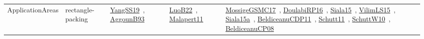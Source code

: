 {\begin{longtable}{lp{3cm}>{\raggedright\arraybackslash}p{6cm}>{\raggedright\arraybackslash}p{6cm}>{\raggedright\arraybackslash}p{8cm}}
ApplicationAreas & rectangle-packing & \href{../works/YangSS19.pdf}{YangSS19}~\cite{YangSS19}, \href{../works/AggounB93.pdf}{AggounB93}~\cite{AggounB93} & \href{../works/LuoB22.pdf}{LuoB22}~\cite{LuoB22}, \href{../works/Malapert11.pdf}{Malapert11}~\cite{Malapert11} & \href{../works/MossigeGSMC17.pdf}{MossigeGSMC17}~\cite{MossigeGSMC17}, \href{../works/DoulabiRP16.pdf}{DoulabiRP16}~\cite{DoulabiRP16}, \href{../works/Siala15.pdf}{Siala15}~\cite{Siala15}, \href{../works/VilimLS15.pdf}{VilimLS15}~\cite{VilimLS15}, \href{../works/Siala15a.pdf}{Siala15a}~\cite{Siala15a}, \href{../works/BeldiceanuCDP11.pdf}{BeldiceanuCDP11}~\cite{BeldiceanuCDP11}, \href{../works/Schutt11.pdf}{Schutt11}~\cite{Schutt11}, \href{../works/SchuttW10.pdf}{SchuttW10}~\cite{SchuttW10}, \href{../works/BeldiceanuCP08.pdf}{BeldiceanuCP08}~\cite{BeldiceanuCP08}\\

\end{longtable}}
